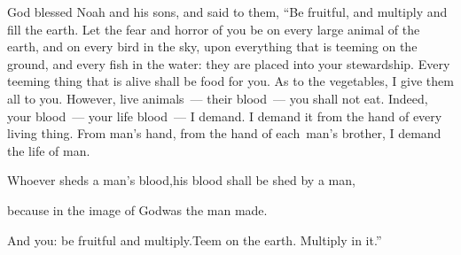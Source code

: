 
\begin{inparaenum}
   God blessed Noah and his sons, and said to them, ``Be fruitful, and multiply and fill the earth.%
   Let the fear and horror of you be on every large animal of the earth, and on every bird in the sky, upon everything that is teeming on the ground, and every fish in the water: they are placed into your stewardship.%
   Every teeming thing that is alive shall be food for you. As to the vegetables, I give them all to you.%
   However, live animals~--- their blood~--- you shall not eat.%
   Indeed, your blood~--- your life blood\understood~--- I demand. I demand it from the hand of every living thing. From man's hand, from the hand of each\understood\ man's brother, I demand the life of man.%
  
  \pc {} Whoever sheds a man's blood,\pa his blood shall be shed by a man,%
  
  \pc because in the image of God\pa was the man made.%
  
  \pc {} And you: be fruitful and multiply.\pa Teem on the earth. Multiply in it.''%
  

\end{inparaenum}
